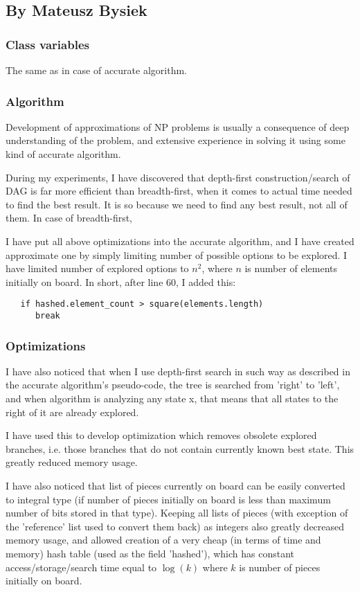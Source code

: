 \subsection{By Mateusz Bysiek}

\subsubsection{Class variables}
The same as in case of accurate algorithm.

\subsubsection{Algorithm}
Development of approximations of NP problems is usually a consequence 
of deep understanding of the problem, and extensive experience in solving it using
some kind of accurate algorithm.

During my experiments, I have discovered that depth-first construction/search of DAG is far more
efficient than breadth-first, when it comes to actual time needed to find the best result. It is so
because we need to find any best result, not all of them. In case of breadth-first, 

I have put all above optimizations into the accurate algorithm, and I have created approximate one
by simply limiting number of possible options to be explored. I have limited number of explored
options to $n^2$, where $n$ is number of elements initially on board. In short, after line 60, I
added this:

\begin{verbatim}
   if hashed.element_count > square(elements.length)
      break
\end{verbatim}

\subsubsection{Optimizations}
I have also noticed that when I use depth-first search in such way as described in the accurate
algorithm's pseudo-code, the tree is searched from 'right' to 'left', and when algorithm is
analyzing any state x, that means that all states to the right of it are already explored.

I have used this to develop optimization which removes obsolete explored branches, i.e. those
branches that do not contain currently known best state. This greatly reduced memory usage.

I have also noticed that list of pieces currently on board can be easily converted to integral type
(if number of pieces initially on board is less than maximum number of bits stored in that type).
Keeping all lists of pieces (with exception of the 'reference' list used to convert them back) as
integers also greatly decreased memory usage, and allowed creation of a very cheap (in terms of time
and memory) hash table (used as the field 'hashed'), which has constant access/storage/search time
equal to $\log (k)$ where $k$ is number of pieces initially on board.

